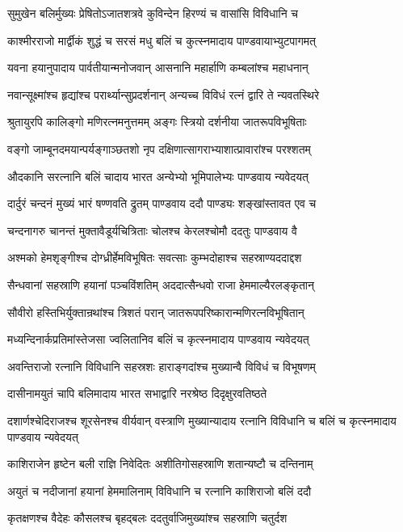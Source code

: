 \twolineshloka
{सुमुखेन बलिर्मुख्यः प्रेषितोऽजातशत्रवे}
{कुविन्देन हिरण्यं च वासांसि विविधानि च}


\twolineshloka
{काश्मीरराजो मार्द्वीकं शुद्धं च सरसं मधु}
{बलिं च कुत्स्नमादाय पाण्डवायाभ्युटपागमत्}


\twolineshloka
{यवना हयानुपादाय पार्वतीयान्मनोजवान्}
{आसनानि महार्हाणि कम्बलांश्च महाधनान्}


\twolineshloka
{नवान्सूक्ष्मांश्च हृद्यांश्च परार्थ्यान्सुप्रदर्शनान्}
{अन्यच्च विविधं रत्नं द्वारि ते न्यवतस्थिरे}


\twolineshloka
{श्रुतायुरपि कालिङ्गो मणिरत्नमनुत्तमम्}
{अङ्गः स्त्रियो दर्शनीया जातरूपविभूषिताः}


\twolineshloka
{वङ्गो जाम्बूनदमयान्पर्यङ्गाञ्छतशो नृप}
{दक्षिणात्सागराभ्याशात्प्रावारांश्च परश्शतम्}


\twolineshloka
{औदकानि सरत्नानि बलिं चादाय भारत}
{अन्येभ्यो भूमिपालेभ्यः पाण्डवाय न्यवेदयत्}


\twolineshloka
{दार्दुरं चन्दनं मुख्यं भारं षण्णवति द्रुतम्}
{पाण्डवाय ददौ पाण्ड्यः शङ्खांस्तावत एव च}


\twolineshloka
{चन्दनागरु चानन्तं मुक्तावैडूर्यचित्रिताः}
{चोलश्च केरलश्चोमौ ददतुः पाण्डवाय वै}


\twolineshloka
{अश्मको हेमशृङ्गीश्च दोग्ध्रीर्हेमविभूषितः}
{सवत्साः कुम्भदोहाश्च सहस्राण्यददाद्दश}


\twolineshloka
{सैन्धवानां सहस्राणि हयानां पञ्चविंशतिम्}
{अददात्सैन्धवो राजा हेममाल्यैरलङ्कृतान्}


\twolineshloka
{सौवीरो हस्तिभिर्युक्तान्रथांश्च त्रिशतं परान्}
{जातरूपपरिष्कारान्मणिरत्नविभूषितान्}


\twolineshloka
{मध्यन्दिनार्कप्रतिमांस्तेजसा ज्वलितानिव}
{बलिं च कृत्स्नमादाय पाण्डवाय न्यवेदयत्}


\twolineshloka
{अवन्तिराजो रत्नानि विविधानि सहस्रशः}
{हाराङ्गदांश्च मुख्यान्वै विविधं च विभूषणम्}


\twolineshloka
{दासीनामयुतं चापि बलिमादाय भारत}
{सभाद्वारि नरश्रेष्ठ दिदृक्षुरवतिष्ठते}


\threelineshloka
{दशार्णश्चेदिराजश्च शूरसेनश्च वीर्यवान्}
{वस्त्राणि मुख्यान्यादाय रत्नानि विविधानि च}
{बलिं च कृत्स्नमादाय पाण्डवाय न्यवेदयत्}


\twolineshloka
{काशिराजेन हृष्टेन बली राज्ञि निवेदितः}
{अशीतिगोसहस्राणि शतान्यष्टौ च दन्तिनाम्}


\twolineshloka
{अयुतं च नदीजानां हयानां हेममालिनाम्}
{विविधानि च रत्नानि काशिराजो बलिं ददौ}


\twolineshloka
{कृतक्षणश्च वैदेहः कौसलश्च बृहद्बलः}
{ददतुर्वाजिमुख्यांश्च सहस्राणि चतुर्दश}


